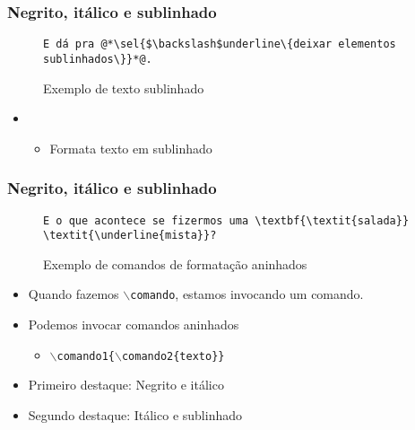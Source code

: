 \begin{frame}[fragile] \frametitle{Negrito, itálico e sublinhado}
\begin{figure}[!t]
\caption{Exemplo de texto sublinhado}
\begin{lstlisting}
E dá pra @*\sel{$\backslash$underline\{deixar elementos sublinhados\}}*@.
\end{lstlisting}
\ownsrc
\end{figure}

\begin{itemize}
	\item {}
	\begin{itemize}
		\item Formata texto em sublinhado
	\end{itemize}
\end{itemize}
\end{frame}

\begin{frame}[fragile] \frametitle{Negrito, itálico e sublinhado}
\begin{figure}[!t]
\caption{Exemplo de comandos de formatação aninhados}
\begin{lstlisting}
E o que acontece se fizermos uma \textbf{\textit{salada}} \textit{\underline{mista}}?
\end{lstlisting}
\ownsrc
\end{figure}

\begin{itemize}
	\item Quando fazemos $\backslash$\texttt{comando}, estamos invocando um comando.
	\item Podemos invocar comandos aninhados
	\begin{itemize}
		\item \texttt{$\backslash$comando1\{$\backslash$comando2\{texto\}\}}
	\end{itemize}
	\item Primeiro destaque: Negrito e itálico
	\item Segundo destaque: Itálico e sublinhado
\end{itemize}
\end{frame}